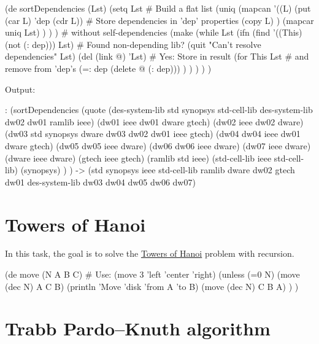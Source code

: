 \begin{wideverbatim}

(de sortDependencies (Lst)
   (setq Lst                              # Build a flat list
      (uniq
         (mapcan
            '((L)
               (put (car L) 'dep (cdr L)) # Store dependencies in 'dep' properties
               (copy L) )
            (mapcar uniq Lst) ) ) )       # without self-dependencies
   (make
      (while Lst
         (ifn (find '((This) (not (: dep))) Lst)   # Found non-depending lib?
            (quit "Can't resolve dependencies" Lst)
            (del (link @) 'Lst)                    # Yes: Store in result
            (for This Lst                          # and remove from 'dep's
               (=: dep (delete @ (: dep))) ) ) ) ) )

Output:

: (sortDependencies
   (quote
      (des-system-lib   std synopsys std-cell-lib des-system-lib dw02 dw01 ramlib ieee)
      (dw01             ieee dw01 dware gtech)
      (dw02             ieee dw02 dware)
      (dw03             std synopsys dware dw03 dw02 dw01 ieee gtech)
      (dw04             dw04 ieee dw01 dware gtech)
      (dw05             dw05 ieee dware)
      (dw06             dw06 ieee dware)
      (dw07             ieee dware)
      (dware            ieee dware)
      (gtech            ieee gtech)
      (ramlib           std ieee)
      (std-cell-lib     ieee std-cell-lib)
      (synopsys) ) )
-> (std synopsys ieee std-cell-lib ramlib dware dw02 gtech dw01
    des-system-lib dw03 dw04 dw05 dw06 dw07)

\end{wideverbatim}

\pagebreak{}
\section*{Towers of Hanoi}

In this task, the goal is to solve the
\href{http://en.wikipedia.org/wiki/Towers\_of\_Hanoi}{Towers of Hanoi}
problem with recursion.

\begin{wideverbatim}

(de move (N A B C)  # Use: (move 3 'left 'center 'right)
   (unless (=0 N)
      (move (dec N) A C B)
      (println 'Move 'disk 'from A 'to B)
      (move (dec N) C B A) ) )

\end{wideverbatim}

\pagebreak{}
\section*{Trabb Pardo–Knuth algorithm}

